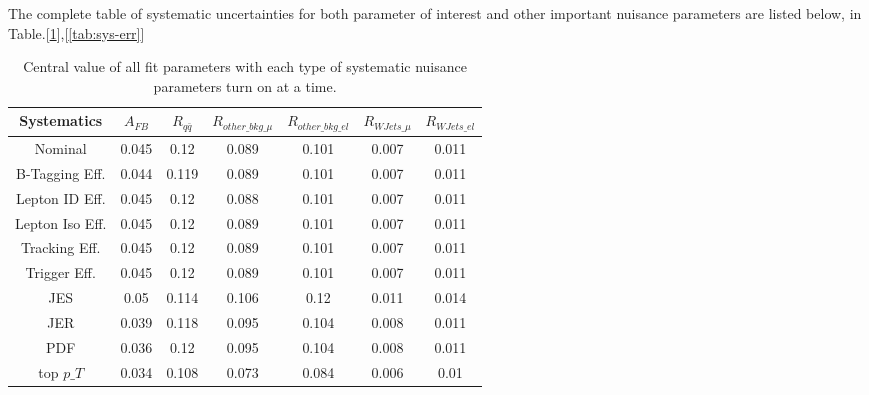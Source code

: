 The complete table of systematic uncertainties for both parameter of interest and other important nuisance parameters are listed below, in Table.[\ref{tab:sys-full}],[\ref{tab:sys-err}]

\begin{table}[htb]
\centering
\begin{tabular}{c|cc|cccc}
Systematics &      $A_{FB}$ &   $R_{q\bar{q}}$ & $R_{other\_bkg\_\mu}$ & $R_{other\_bkg\_el}$ & $R_{WJets\_\mu}$ & $R_{WJets\_el}$ \\
\hline
Nominal         &  0.045 &   0.12 &          0.089 &          0.101 &      0.007 &      0.011 \\
\hline
B-Tagging Eff.  &  0.044 &  0.119 &          0.089 &          0.101 &      0.007 &      0.011 \\
Lepton ID Eff.  &  0.045 &   0.12 &          0.088 &          0.101 &      0.007 &      0.011 \\
Lepton Iso Eff. &  0.045 &   0.12 &          0.089 &          0.101 &      0.007 &      0.011 \\
Tracking Eff.   &  0.045 &   0.12 &          0.089 &          0.101 &      0.007 &      0.011 \\
Trigger Eff.    &  0.045 &   0.12 &          0.089 &          0.101 &      0.007 &      0.011 \\
\hline
JES             &   0.05 &  0.114 &          0.106 &           0.12 &      0.011 &      0.014 \\
JER             &  0.039 &  0.118 &          0.095 &          0.104 &      0.008 &      0.011 \\
PDF             &  0.036 &   0.12 &          0.095 &          0.104 &      0.008 &      0.011 \\
\hline
top $p\_T$         &  0.034 &  0.108 &          0.073 &          0.084 &      0.006 &       0.01 \\
\hline
\end{tabular}
\caption{Central value of all fit parameters with each type of systematic nuisance parameters turn on at a time.}
\label{tab:sys-full}
\end{table}


